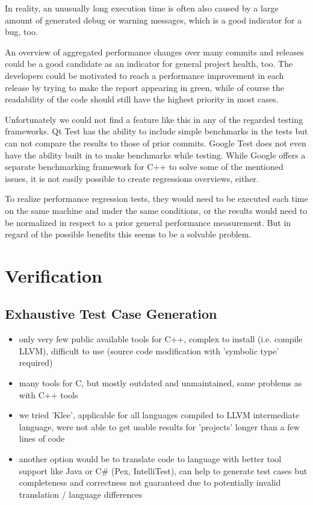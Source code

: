 \documentclass{scrreprt}
\begin{document}
In reality, an unusually long execution time is often also caused by a large amount of generated debug or warning messages, which is a good indicator for a bug, too.

An overview of aggregated performance changes over many commits and releases could be a good candidate as an indicator for general project health, too. The developers could be motivated to reach a performance improvement in each release by trying to make the report appearing in green, while of course the readability of the code should still have the highest priority in most cases.

Unfortunately we could not find a feature like this in any of the regarded testing frameworks. Qt Test has the ability to include simple benchmarks in the tests but can not compare the results to those of prior commits. Google Test does not even have the ability built in to make benchmarks while testing. While Google offers a separate benchmarking framework for C++ to solve some of the mentioned issues, it is not easily possible to create regressions overviews, either.

To realize performance regression tests, they would need to be executed each time on the same machine and under the same conditions, or the results would need to be normalized in respect to a prior general performance measurement. But in regard of the possible benefits this seems to be a solvable problem.



\chapter{Verification}

\section{Exhaustive Test Case Generation}

\begin{itemize}
	\item only very few public available tools for C++, complex to install (i.e. compile LLVM), difficult to use (source code modification with 'symbolic type' required)
	\item many tools for C, but mostly outdated and unmaintained, same problems as with C++ tools
	\item we tried 'Klee', applicable for all languages compiled to LLVM intermediate language, were not able to get usable results for 'projects' longer than a few lines of code
	\item another option would be to translate code to language with better tool support like Java or C\# (Pex, IntelliTest), can help to generate test cases but completeness and correctness not guaranteed due to potentially invalid translation / language differences
\end{itemize}
\end{document}

